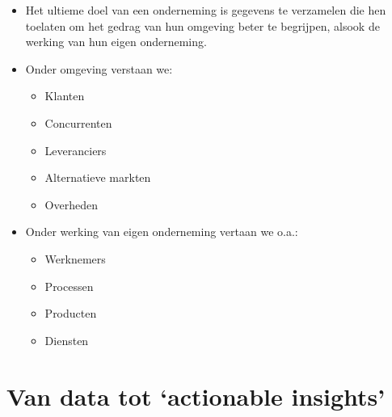 \documentclass[]{memoir}
\providecommand{\tightlist}{%
  \setlength{\itemsep}{0pt}\setlength{\parskip}{0pt}}
\begin{document}
\begin{itemize}
\tightlist
\item
  Het ultieme doel van een onderneming is gegevens te verzamelen die hen toelaten om het gedrag van hun omgeving beter te begrijpen, alsook de werking van hun eigen onderneming.
\item
  Onder omgeving verstaan we:

  \begin{itemize}
  \tightlist
  \item
    Klanten
  \item
    Concurrenten
  \item
    Leveranciers
  \item
    Alternatieve markten
  \item
    Overheden
  \end{itemize}
\item
  Onder werking van eigen onderneming vertaan we o.a.:

  \begin{itemize}
  \tightlist
  \item
    Werknemers
  \item
    Processen
  \item
    Producten
  \item
    Diensten
  \end{itemize}
\end{itemize}

\hypertarget{van-data-tot-actionable-insights}{%
\section{Van data tot `actionable insights'}\label{van-data-tot-actionable-insights}}
\end{document}
